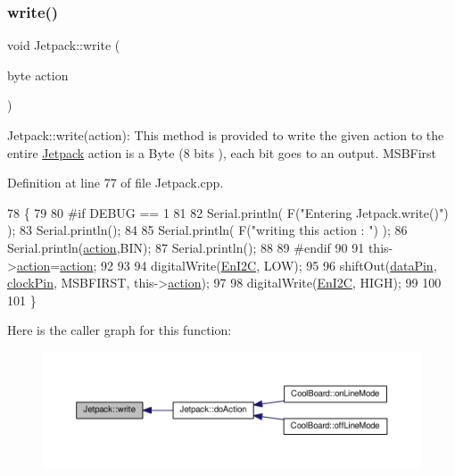 \subsubsection{\texorpdfstring{write()}{write()}}
{\footnotesize\ttfamily void Jetpack\+::write (\begin{DoxyParamCaption}\item[{byte}]{action }\end{DoxyParamCaption})}

Jetpack\+::write(action)\+: This method is provided to write the given action to the entire \hyperlink{class_jetpack}{Jetpack} action is a Byte (8 bits ), each bit goes to an output. M\+S\+B\+First 

Definition at line 77 of file Jetpack.\+cpp.


\begin{DoxyCode}
78 \{
79 
80 \textcolor{preprocessor}{#if DEBUG == 1}
81 
82     Serial.println( F(\textcolor{stringliteral}{"Entering Jetpack.write()"}) );
83     Serial.println();
84 
85     Serial.println( F(\textcolor{stringliteral}{"writing this action : "}) );
86     Serial.println(\hyperlink{class_jetpack_aca3142925a7b0834b34ae91d26af7765}{action},BIN);
87     Serial.println();
88 
89 \textcolor{preprocessor}{#endif }
90 
91     this->\hyperlink{class_jetpack_aca3142925a7b0834b34ae91d26af7765}{action}=\hyperlink{class_jetpack_aca3142925a7b0834b34ae91d26af7765}{action};
92 
93     
94     digitalWrite(\hyperlink{class_jetpack_a81df984fb4cea98c71aa1a1cfcdfe814}{EnI2C}, LOW);
95     
96     shiftOut(\hyperlink{class_jetpack_a3d669a56e93c71dd25f970d4ed7d0c00}{dataPin}, \hyperlink{class_jetpack_a58ebb991f358f3ae94e82148b0221b5a}{clockPin}, MSBFIRST, this->\hyperlink{class_jetpack_aca3142925a7b0834b34ae91d26af7765}{action});
97 
98     digitalWrite(\hyperlink{class_jetpack_a81df984fb4cea98c71aa1a1cfcdfe814}{EnI2C}, HIGH);
99 
100 
101 \}
\end{DoxyCode}
Here is the caller graph for this function\+:\nopagebreak
\begin{figure}[H]
\begin{center}
\leavevmode
\includegraphics[width=350pt]{df/d1d/class_jetpack_a338f1af8cbc6504ac69b47c7328569b5_icgraph}
\end{center}
\end{figure}
\mbox{\label{class_jetpack_a79ae7bc3c1828a0551a7c005c4f8bd00}} 

